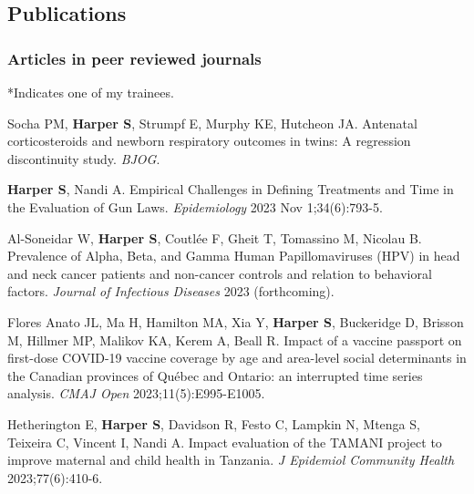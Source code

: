 \documentclass[
  letterpaper,
  DIV=11,
  numbers=noendperiod]{scrartcl}
\begin{document}
\hypertarget{publications}{%
\subsection{Publications}\label{publications}}

\hypertarget{articles-in-peer-reviewed-journals}{%
\subsubsection{Articles in peer reviewed
journals}\label{articles-in-peer-reviewed-journals}}

*Indicates one of my trainees.

\begin{etaremune}

\item *Socha PM, \textbf{Harper S}, Strumpf E, Murphy KE, Hutcheon JA. Antenatal corticosteroids and newborn respiratory outcomes in twins: A regression discontinuity study. \emph{BJOG}. 

\item \textbf{Harper S}, Nandi A. Empirical Challenges in Defining Treatments and Time in the Evaluation of Gun Laws. \emph{Epidemiology} 2023 Nov 1;34(6):793-5. 

\item *Al-Soneidar W, \textbf{Harper S}, Coutlée F, Gheit T, Tomassino M, Nicolau B. Prevalence of Alpha, Beta, and Gamma Human Papillomaviruses (HPV) in head and neck cancer patients and non-cancer controls and relation to behavioral factors. \emph{Journal of Infectious Diseases} 2023 (forthcoming). 

\item Flores Anato JL, Ma H, Hamilton MA, Xia Y, \textbf{Harper S}, Buckeridge D, Brisson M, Hillmer MP, Malikov KA, Kerem A, Beall R. Impact of a vaccine passport on first-dose COVID-19 vaccine coverage by age and area-level social determinants in the Canadian provinces of Québec and Ontario: an interrupted time series analysis. \emph{CMAJ Open} 2023;11(5):E995-E1005. 

\item *Hetherington E, \textbf{Harper S}, Davidson R, Festo C, Lampkin N, Mtenga S, Teixeira C, Vincent I, Nandi A. Impact evaluation of the TAMANI project to improve maternal and child health in Tanzania. \emph{J Epidemiol Community Health} 2023;77(6):410-6. 


\end{etaremune}
\end{document}
